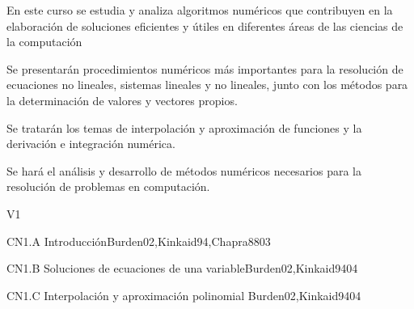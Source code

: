 
\begin{syllabus}


\begin{justification}
   En este curso se estudia y analiza algoritmos numéricos que
   contribuyen en la elaboración de soluciones eficientes y útiles en
   diferentes áreas de las ciencias de la computación
   \end{justification}
   
   \begin{goals}
   \item Se presentarán procedimientos numéricos más importantes para la resolución de 
   ecuaciones no lineales, sistemas lineales y no lineales, junto con los métodos 
   para la determinación de valores y vectores propios.
   
   \item Se tratarán los temas de interpolación y aproximación de funciones y la 
   derivación e integración numérica.
   
   \item Se hará el análisis y desarrollo de métodos numéricos necesarios para la 
   resolución de problemas en computación.
   \end{goals}
   
   \begin{outcomes}{V1}
      \item {}
      \item {}
      \item {}
   \end{outcomes}
   
   \begin{unit}{CN1.A Introducción}{}{Burden02,Kinkaid94,Chapra88}{0}{3}
   \end{unit}
   
   \begin{unit}{CN1.B Soluciones de ecuaciones de una variable}{}{Burden02,Kinkaid94}{0}{4}
   \end{unit}
   
   \begin{unit}{CN1.C Interpolación y aproximación polinomial }{}{Burden02,Kinkaid94}{0}{4}
   \end{unit}
   

\end{syllabus}
